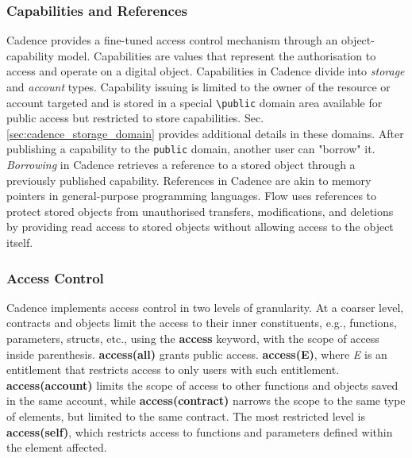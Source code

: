 \documentclass[../NFTComp_IEEE.tex]{subfiles}
\begin{document}
\subsubsection{Capabilities and References}
\label{sec:cadence_capabilities}
Cadence provides a fine-tuned access control mechanism through an object-capability model. Capabilities are values that represent the authorisation to access and operate on a digital object. Capabilities in Cadence divide into \textit{storage} and \textit{account} types. Capability issuing is limited to the owner of the resource or account targeted and is stored in a special \verb|\public| domain area available for public access but restricted to store capabilities. Sec. \ref{sec:cadence_storage_domain} provides additional details in these domains. After publishing a capability to the \verb|public| domain, another user can "borrow" it. \textit{Borrowing} in Cadence retrieves a reference to a stored object through a previously published capability. References in Cadence are akin to memory pointers in general-purpose programming languages. Flow uses references to protect stored objects from unauthorised transfers, modifications, and deletions by providing read access to stored objects without allowing access to the object itself.

\subsubsection{Access Control}
Cadence implements access control in two levels of granularity. At a coarser level, contracts and objects limit the access to their inner constituents, e.g., functions, parameters, structs, etc., using the \textbf{access} keyword, with the scope of access inside parenthesis. \textbf{access(all)} grants public access. \textbf{access(E)}, where \textit{E} is an entitlement that restricts access to only users with such entitlement. \textbf{access(account)} limits the scope of access to other functions and objects saved in the same account, while \textbf{access(contract)} narrows the scope to the same type of elements, but limited to the same contract. The most restricted level is \textbf{access(self)}, which restricts access to functions and parameters defined within the element affected.
\end{document}
